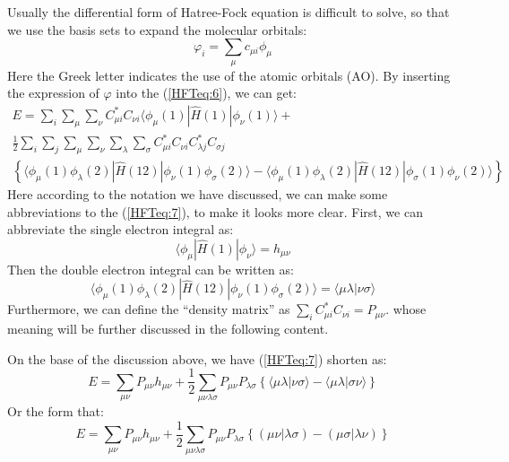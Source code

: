 Usually the differential form of Hatree-Fock equation is difficult
to solve, so that we use the basis sets to expand the molecular
orbitals:
\begin{equation}\label{HFTeq:8}
    \varphi_{i} = \sum_{\mu}c_{\mu i}\phi_{\mu}
\end{equation}
Here the Greek letter indicates the use of the atomic orbitals (AO). By
inserting the expression of $\varphi$ into the
(\ref{HFTeq:6}), we can get:
\begin{multline}\label{HFTeq:7}
E = \sum_{i}\sum_{\mu} \sum_{\nu} C^{*}_{\mu i} C_{\nu
i} \langle\phi_{\mu}(1)|\hat{H}(1)|\phi_{\nu}(1)\rangle +  \\
\frac{1}{2} \sum_{i}\sum_{j}\sum_{\mu} \sum_{\nu} \sum_{\lambda}
\sum_{\sigma} C^{*}_{\mu i} C_{\nu i} C^{*}_{\lambda j} C_{\sigma j}
\\
 \left\{
\langle\phi_{\mu}(1)\phi_{\lambda}(2)|\hat{H}(12)|\phi_{\nu}(1)\phi_{\sigma}(2)\rangle-
\langle\phi_{\mu}(1)\phi_{\lambda}(2)|\hat{H}(12)|\phi_{\sigma}(1)\phi_{\nu}(2)\rangle
\right \}
\end{multline}
Here according to the notation we have discussed, we can make some
abbreviations to the (\ref{HFTeq:7}), to make it looks more clear.
First, we can abbreviate the single electron integral as:
\begin{equation}\label{}
\langle\phi_{\mu}|\hat{H}(1)|\phi_{\nu}\rangle = h_{\mu \nu}
\end{equation}
Then the double electron integral can be written as:
\begin{equation}\label{}
  \langle\phi_{\mu}(1)\phi_{\lambda}(2)|\hat{H}(12)|\phi_{\nu}(1)\phi_{\sigma}(2)\rangle
  = \langle \mu\lambda | \nu\sigma \rangle
\end{equation}
Furthermore, we can define the ``density matrix'' as
$\sum_{i}C^{*}_{\mu i} C_{\nu i} = P_{\mu\nu}$. whose meaning
will be further discussed in the following content.

On the base of the discussion above, we have (\ref{HFTeq:7}) shorten
as:
\begin{equation}\label{HFTeq:11}
    E = \sum_{\mu \nu}P_{\mu\nu}h_{\mu \nu} + \frac{1}{2}
    \sum_{\mu \nu \lambda\sigma}P_{\mu\nu}P_{\lambda\sigma}
    \left \{ \langle\mu\lambda | \nu\sigma\rangle - \langle\mu \lambda | \sigma\nu\rangle
    \right \}
\end{equation}
Or the form that:
\begin{equation}\label{HFTeq:11-1}
    E = \sum_{\mu \nu}P_{\mu\nu}h_{\mu \nu} + \frac{1}{2}
    \sum_{\mu \nu \lambda\sigma}P_{\mu\nu}P_{\lambda\sigma}
    \left \{ (\mu\nu|\lambda\sigma) - (\mu \sigma|\lambda\nu)
    \right \}
\end{equation}

